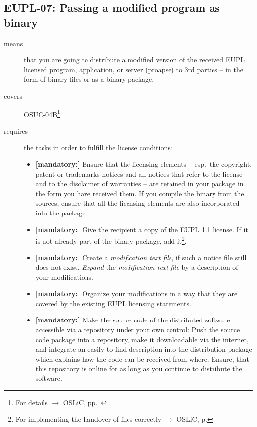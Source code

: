 \subsection{EUPL-07: Passing a modified program as binary}
\label{OSUC-04B-EUPL}

\begin{description}
\item[means] that you are going to distribute a modified version of the received
EUPL licensed pro\-gram, application, or server (proapse) to 3rd parties -- in
the form of binary files or as a binary package.
\item[covers] OSUC-04B\footnote{For details $\rightarrow$ OSLiC, pp.\
\pageref{OSUC-04B-DEF}}
\item[requires] the tasks in order to fulfill the license conditions:
\begin{itemize}

  \item \textbf{[mandatory:]} Ensure that the licensing elements -- esp.\ the
  copyright, patent or trademarks notices and all notices that refer to the
  license and to the disclaimer of warranties -- are retained in your package in
  the form you have received them. If you compile the binary from the sources,
  ensure that all the licensing elements are also incorporated into the package.

 \item \textbf{[mandatory:]} Give the recipient a copy of the EUPL 1.1
  license. If it is not already part of the binary package, add
  it\footnote{For implementing the handover of files correctly $\rightarrow$
  OSLiC, p. \pageref{DistributingFilesHint}}.
  
  \item \textbf{[mandatory:]} Create a \emph{modification text file}, if such a
  notice file still does not exist. \emph{Expand} the \emph{modification text
  file} by a description of your modifications.

  \item \textbf{[mandatory:]} Organize your modifications in a way that they are
  covered by the existing EUPL licensing statements.
  
  \item \textbf{[mandatory:]} Make the source code of the distributed software
  accessible via a repository under your own control: Push the source code
  package into a repository, make it downloadable via the internet, and
  integrate an easily to find description into the distribution package which
  explains how the code can be received from where. Ensure, that this repository
  is online for as long as you continue to distribute the software.
  

\end{itemize}
\end{description}
